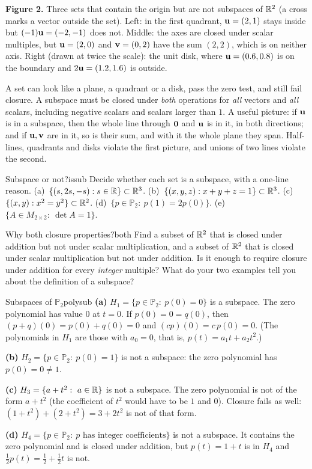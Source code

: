 \documentclass[11pt]{article}
\begin{document}
\textbf{Figure 2.} Three sets that contain the origin but are not subspaces of $\mathbb{R}^2$ (a cross marks a vector outside the set). Left: in the first quadrant, $\mathbf{u}=(2,1)$ stays inside but $(-1)\mathbf{u}=(-2,-1)$ does not. Middle: the axes are closed under scalar multiples, but $\mathbf{u}=(2,0)$ and $\mathbf{v}=(0,2)$ have the sum $(2,2)$, which is on neither axis. Right (drawn at twice the scale): the unit disk, where $\mathbf{u}=(0.6,0.8)$ is on the boundary and $2\mathbf{u}=(1.2,1.6)$ is outside.

\begin{warn}
A set can look like a plane, a quadrant or a disk, pass the zero test, and still fail closure. A subspace must be closed under \emph{both} operations for \emph{all} vectors and \emph{all} scalars, including negative scalars and scalars larger than $1$. A useful picture: if $\mathbf{u}$ is in a subspace, then the whole line through $\mathbf{0}$ and $\mathbf{u}$ is in it, in both directions; and if $\mathbf{u},\mathbf{v}$ are in it, so is their sum, and with it the whole plane they span. Half-lines, quadrants and disks violate the first picture, and unions of two lines violate the second.
\end{warn}

\begin{kc}{Subspace or not?}{issub}
Decide whether each set is a subspace, with a one-line reason. (a)~$\{(s,2s,-s):s\in\mathbb{R}\}\subset\mathbb{R}^3$. (b)~$\{(x,y,z):x+y+z=1\}\subset\mathbb{R}^3$. (c)~$\{(x,y):x^2=y^2\}\subset\mathbb{R}^2$. (d)~$\{p\in\mathbb{P}_2:\ p(1)=2p(0)\}$. (e)~$\{A\in M_{2\times2}:\ \det A=1\}$.
\end{kc}

\begin{think}{Why both closure properties?}{both}
Find a subset of $\mathbb{R}^2$ that is closed under addition but not under scalar multiplication, and a subset of $\mathbb{R}^2$ that is closed under scalar multiplication but not under addition. Is it enough to require closure under addition for every \emph{integer} multiple? What do your two examples tell you about the definition of a subspace?
\end{think}

\begin{exmp}{Subspaces of $\mathbb{P}_2$}{polysub}
\textbf{(a)} $H_1=\{p\in\mathbb{P}_2:\ p(0)=0\}$ is a subspace. The zero polynomial has value $0$ at $t=0$. If $p(0)=0=q(0)$, then $(p+q)(0)=p(0)+q(0)=0$ and $(cp)(0)=c\,p(0)=0$. (The polynomials in $H_1$ are those with $a_0=0$, that is, $p(t)=a_1t+a_2t^2$.)

\textbf{(b)} $H_2=\{p\in\mathbb{P}_2:\ p(0)=1\}$ is not a subspace: the zero polynomial has $p(0)=0\neq1$.

\textbf{(c)} $H_3=\{a+t^2:\ a\in\R\}$ is not a subspace. The zero polynomial is not of the form $a+t^2$ (the coefficient of $t^2$ would have to be $1$ and $0$). Closure fails as well: $(1+t^2)+(2+t^2)=3+2t^2$ is not of that form.

\textbf{(d)} $H_4=\{p\in\mathbb{P}_2:\ p\text{ has integer coefficients}\}$ is not a subspace. It contains the zero polynomial and is closed under addition, but $p(t)=1+t$ is in $H_4$ and $\tfrac12p(t)=\tfrac12+\tfrac12t$ is not.
\end{exmp}
\end{document}
